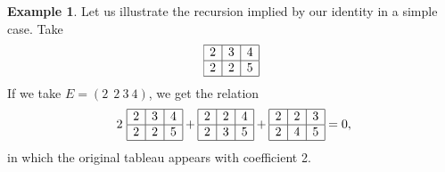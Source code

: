\documentclass[10pt]{amsart}
\theoremstyle{definition}
\newtheorem*{example}{Example}
\theoremstyle{remark}
\begin{document}
\begin{example} Let us  illustrate the recursion implied by our identity in a simple case.
Take 
 \[\begin{array}{|c|c|c|}
\hline
2&3&4\\ \hline
2&2&5\\ \hline \end{array}\]
    If we take $E=(2\  \ 2\ 3\ 4)$, we get the relation 
      \[\ 2\  
\begin{array}{|c|c|c|}
\hline
2&3&4\\ \hline
2&2&5\\ \hline
\end{array}
+
\begin{array}{|c|c|c|}
\hline
2&2&4\\ \hline
2&3&5\\ \hline
\end{array}
+
\begin{array}{|c|c|c|}
\hline
2&2&3\\ \hline
2&4&5\\ \hline
\end{array}
=0, \]
in which the original tableau appears with coefficient 2.


\end{example}
\end{document}
